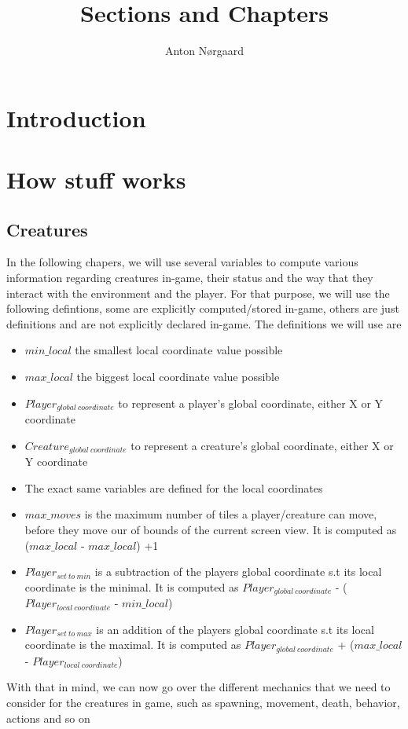 \documentclass{article}
\title{Sections and Chapters}
\author{Anton Nørgaard}
\date{ }
\begin{document}
  
\maketitle
  
\tableofcontents

\section*{Introduction}
   
\section*{How stuff works}
\subsection*{Creatures}
In the following chapers, we will use several variables to compute various information regarding creatures in-game, their status and the way
that they interact with the environment and the player. For that purpose, we will use the following defintions, some are explicitly computed/stored in-game, others are just definitions and are not explicitly declared in-game. The definitions we will use are
\begin{itemize}
\item $min\_local$ the smallest local coordinate value possible 
\item $max\_local$ the biggest local coordinate value possible 
\item $Player_{global  \:coordinate}$  to represent a player's global coordinate, either X or Y coordinate 
\item $Creature_{global \: coordinate}$ to represent a creature's global coordinate, either X or Y coordinate 
\item The exact same variables are defined for the local coordinates 
\item $max\_moves$ is the maximum number of tiles a player/creature can move, before they move our of bounds of the current screen view. It is computed as  ($max\_local$ - $max\_local$) +1 
\item $Player_{set \: to \: min}$  is a subtraction of the players global coordinate s.t its local coordinate is the minimal. It is computed as  $Player_{global \: coordinate}$ - ($Player_{local \: coordinate}$ - $min\_local$)
\item $Player_{set \: to \: max}$  is an addition of the players global coordinate s.t its local coordinate is the maximal. It is computed as  $Player_{global \: coordinate}$ + ($max\_local$ - $Player_{local \: coordinate}$)
\end{itemize}
With that in mind, we can now go over the different mechanics that we need to consider for the creatures in game, such as spawning, movement, death, behavior, actions and so on
\end{document}
